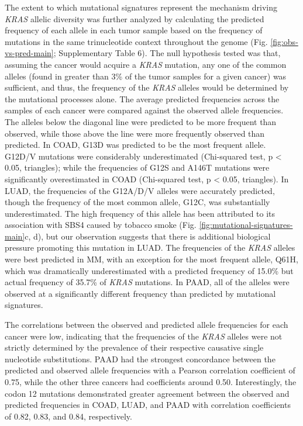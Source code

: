\documentclass[english, 10pt, letterpaper]{article}
\newcommand{\KRAS}{\emph{KRAS}}
\begin{document}
The extent to which mutational signatures represent the mechanism driving \KRAS{} allelic diversity was further analyzed by calculating the predicted frequency of each allele in each tumor sample based on the frequency of mutations in the same trinucleotide context throughout the genome (Fig. \ref{fig:obs-vs-pred-main}; Supplementary Table 6).
The null hypothesis tested was that, assuming the cancer would acquire a \KRAS{} mutation, any one of the common alleles (found in greater than 3\% of the tumor samples for a given cancer) was sufficient, and thus, the frequency of the \KRAS{} alleles would be determined by the mutational processes alone.
The average predicted frequencies across the samples of each cancer were compared against the observed allele frequencies.
The alleles below the diagonal line were predicted to be more frequent than observed, while those above the line were more frequently observed than predicted.
In COAD, G13D was predicted to be the most frequent allele.
G12D/V mutations were considerably underestimated (Chi-squared test, p < 0.05, triangles); while the frequencies of G12S and A146T mutations were significantly overestimated in COAD (Chi-squared test, p < 0.05, triangles).
In LUAD, the frequencies of the G12A/D/V alleles were accurately predicted, though the frequency of the most common allele, G12C, was substantially underestimated.
The high frequency of this allele has been attributed to its association with SBS4 caused by tobacco smoke (Fig. \ref{fig:mutational-signatures-main}c, d), but our observation suggests that there is additional biological pressure promoting this mutation in LUAD.
The frequencies of the \KRAS{} alleles were best predicted in MM, with an exception for the most frequent allele, Q61H, which was dramatically underestimated with a predicted frequency of 15.0\% but actual frequency of 35.7\% of \KRAS{} mutations.
In PAAD, all of the alleles were observed at a significantly different frequency than predicted by mutational signatures.

The correlations between the observed and predicted allele frequencies for each cancer were low, indicating that the frequencies of the \KRAS{} alleles were not strictly determined by the prevalence of their respective causative single nucleotide substitutions.
PAAD had the strongest concordance between the predicted and observed allele frequencies with a Pearson correlation coefficient of 0.75, while the other three cancers had coefficients around 0.50.
Interestingly, the codon 12 mutations demonstrated greater agreement between the observed and predicted frequencies in COAD, LUAD, and PAAD with correlation coefficients of 0.82, 0.83, and 0.84, respectively.
\end{document}

